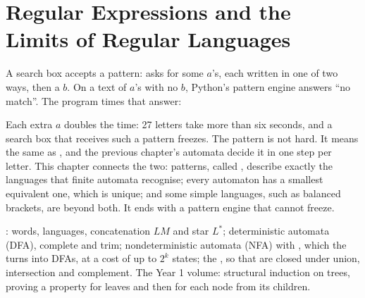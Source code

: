 \chapter{Regular Expressions and the Limits of Regular Languages}\label{ch:b2:regular-languages}

A search box accepts a pattern:  asks for some $a$'s, each written in one of two ways, then a $b$. On a
text of $a$'s with no $b$, Python's pattern engine answers ``no match''. The program times that answer:

\label{lst:b2:regular-languages:hook}

\label{out:b2:regular-languages:hook}

Each extra $a$ doubles the time: 27 letters take more than six seconds, and a search box that receives such a pattern
freezes. The pattern is not hard. It means the same as , and the previous chapter's automata decide it in one
step per letter. This chapter connects the two: patterns, called , describe exactly the languages
that finite automata recognise; every automaton has a smallest equivalent one, which is unique; and some simple
languages, such as balanced brackets, are beyond both. It ends with a pattern engine that cannot freeze.

\begin{recall}
: words, languages, concatenation $LM$ and star $L^*$; deterministic automata (DFA),
complete and trim; nondeterministic automata (NFA) with , which the  turns
into DFAs, at a cost of up to $2^k$ states; the , so that  are closed under
union, intersection and complement. The Year 1 volume: structural induction on trees, proving a property for leaves
and then for each node from its children.
\end{recall}

